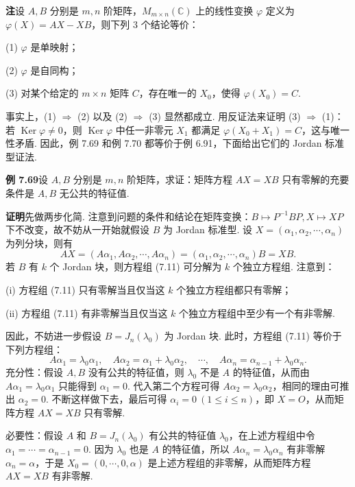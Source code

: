 \documentclass[UTF8, 12pt, fontset=fandol, oneside]{ctexart}
\begin{document}
\noindent\textbf{注}\quad 设 $A,B$ 分别是 $m,n$ 阶矩阵，$M_{m\times n}(\mathbb{C})$ 上的线性变换 $\varphi$ 定义为 $\varphi(X)=AX-XB$，则下列 3 个结论等价：

(1) $\varphi$ 是单映射；

(2) $\varphi$ 是自同构；

(3) 对某个给定的 $m\times n$ 矩阵 $C$，存在唯一的 $X_0$，使得 $\varphi(X_0)=C$.

事实上，(1) $\Rightarrow$ (2) 以及 (2) $\Rightarrow$ (3) 显然都成立. 用反证法来证明 (3) $\Rightarrow$ (1)：若 $\operatorname{Ker}\varphi\ne0$，则 $\operatorname{Ker}\varphi$ 中任一非零元 $X_1$ 都满足 $\varphi(X_0+X_1)=C$，这与唯一性矛盾. 因此，例 7.69 和例 7.70 都等价于例 6.91，下面给出它们的 Jordan 标准型证法.

\noindent\textbf{例 7.69}\quad 设 $A,B$ 分别是 $m,n$ 阶矩阵，求证：矩阵方程 $AX=XB$ 只有零解的充要条件是 $A,B$ 无公共的特征值.

\noindent\textbf{证明}\quad 先做两步化简. 注意到问题的条件和结论在矩阵变换：$B\mapsto P^{-1}BP,X\mapsto XP$ 下不改变，故不妨从一开始就假设 $B$ 为 Jordan 标准型. 设 $X=(\alpha_1,\alpha_2,\cdots,\alpha_n)$ 为列分块，则有
\begin{equation}
AX=(A\alpha_1,A\alpha_2,\cdots,A\alpha_n)=(\alpha_1,\alpha_2,\cdots,\alpha_n)B=XB.
\tag{7.11}
\end{equation}
若 $B$ 有 $k$ 个 Jordan 块，则方程组 (7.11) 可分解为 $k$ 个独立方程组. 注意到：

(i) 方程组 (7.11) 只有零解当且仅当这 $k$ 个独立方程组都只有零解；

(ii) 方程组 (7.11) 有非零解当且仅当这 $k$ 个独立方程组中至少有一个有非零解.

因此，不妨进一步假设 $B=J_n(\lambda_0)$ 为 Jordan 块. 此时，方程组 (7.11) 等价于下列方程组：
\[
A\alpha_1=\lambda_0\alpha_1,\quad A\alpha_2=\alpha_1+\lambda_0\alpha_2,\quad \cdots,\quad A\alpha_n=\alpha_{n-1}+\lambda_0\alpha_n.
\]
充分性：假设 $A,B$ 没有公共的特征值，则 $\lambda_0$ 不是 $A$ 的特征值，从而由 $A\alpha_1=\lambda_0\alpha_1$ 只能得到 $\alpha_1=0$. 代入第二个方程可得 $A\alpha_2=\lambda_0\alpha_2$，相同的理由可推出 $\alpha_2=0$. 不断这样做下去，最后可得 $\alpha_i=0\ (1\le i\le n)$，即 $X=O$，从而矩阵方程 $AX=XB$ 只有零解.

必要性：假设 $A$ 和 $B=J_n(\lambda_0)$ 有公共的特征值 $\lambda_0$，在上述方程组中令 $\alpha_1=\cdots=\alpha_{n-1}=0$. 因为 $\lambda_0$ 也是 $A$ 的特征值，所以 $A\alpha_n=\lambda_0\alpha_n$ 有非零解 $\alpha_n=\alpha$，于是 $X_0=(0,\cdots,0,\alpha)$ 是上述方程组的非零解，从而矩阵方程 $AX=XB$ 有非零解.
\end{document}
